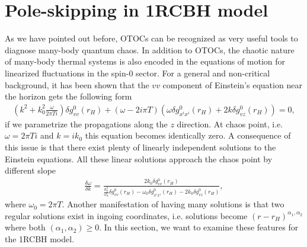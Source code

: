 \documentclass[preprintnumbers,aps,prd,longbibliography,nofootinbib,nobibnotes,amsmath,amssymb]{revtex4}
\begin{document}
\section{Pole-skipping in 1RCBH model}\label{sec4}
As we have pointed out before,  OTOCs can be recognized as very useful tools to diagnose many-body quantum chaos. In addition to OTOCs, the chaotic nature of many-body thermal systems is also encoded in the equations of motion for linearized fluctuations in the spin-0 sector. For a general and non-critical background, it has been shown that the $vv$ component of Einstein's equation near the horizon gets the following form \cite{Blake:2018leo}
\begin{align}
	\left(k^2 + k_0^2\frac{\omega}{2 \pi T i}\right) \delta g^{0}_{v v}(r_H) + (\omega - 2 i \pi T) \left(\omega \delta g^{0}_{x^i x^i}(r_H) + 2 k \delta g^{0}_{v z}(r_H)\right) = 0,
\end{align}
if we parametrize the propagations along the $z$ direction. At chaos point, i.e. $\omega = 2 \pi T i$ and $k = i k_0$ this equation becomes identically zero. A consequence of this issue is that there exist plenty of linearly independent solutions to the Einstein equations. All these linear solutions approach the chaos point by different slope 
	\begin{align}
		\frac{\delta \omega}{\delta k} = \frac{2 k_0 \delta g^{0}_{v v}(r_H)}{\frac{k_0^2}{\omega_0} \delta g^{0}_{v v}(r_H) - \omega_0 \delta g^{0}_{x^i x^i}(r_H) - 2 k_0 \delta g^{0}_{v z}(r_H)},
	\end{align}
	where $\omega_0 = 2 \pi T$. Another manifestation  of having many solutions is that two regular solutions exist in ingoing coordinates, i.e. solutions become $(r -r_H)^{\alpha_1, \alpha_2}$ where both $ (\alpha_1, \alpha_2)\geq 0$. In this section, we want to examine these features for the 1RCBH model.
\end{document}
